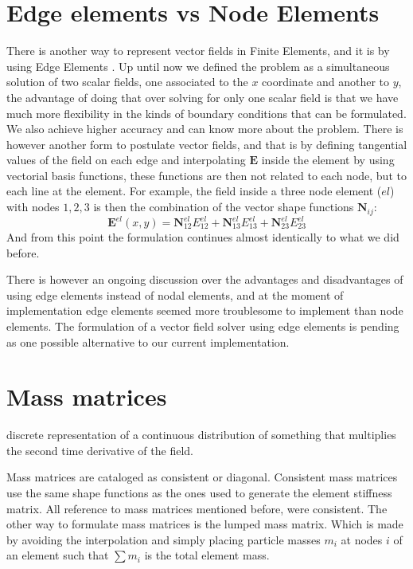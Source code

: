 \section{Edge elements vs Node Elements}
There is another way to represent vector fields in Finite Elements, and it is by using Edge Elements \cite{Jin2010}. Up until now we defined the problem as a simultaneous solution of two scalar fields, one associated to the $x$ coordinate and another to $y$, the advantage of doing that over solving for only one scalar field is that we have much more flexibility in the kinds of boundary conditions that can be formulated. We also achieve higher accuracy and can know more about the problem. 
There is  however another form to postulate vector fields, and that is by defining tangential values of the field on each edge and interpolating $\mathbf{E}$ inside the element by using vectorial basis functions, these functions are then not related to each node, but to each line at the element. For example, the field inside  a three node element ($el$) with nodes $1,2,3$ is then the combination of the vector shape functions $\mathbf{N}_{ij}$:
\begin{equation}
\mathbf{E}^{el}(x,y) =\mathbf{N}_{12}^{el}E_{12}^{el} + \mathbf{N}_{13}^{el}E_{13}^{el}+ \mathbf{N}_{23}^{el}E_{23}^{el}
\end{equation}
And from this point the formulation continues almost identically to what we did before.

There is however an ongoing discussion \cite{Mur1994,Webb1993,Gerr1998} over the advantages and disadvantages of using edge elements instead of nodal elements, and at the moment of implementation edge elements seemed more troublesome to implement than node elements. The formulation of a vector field solver using edge elements is pending as one possible alternative to our current implementation.

\section{Mass matrices}

discrete representation of a continuous distribution of something that multiplies the second time derivative of the field.

Mass matrices are cataloged as consistent or diagonal. Consistent mass matrices use the same shape functions as the ones used to generate the element stiffness matrix. All reference to mass matrices mentioned before, were consistent. \cite{RobertD.Cook1989}
The other way to formulate mass matrices is the lumped mass matrix. Which is made by avoiding the interpolation and simply placing particle masses $m_i$ at nodes $i$ of an element such that $\sum m_i$ is the total element mass. 

